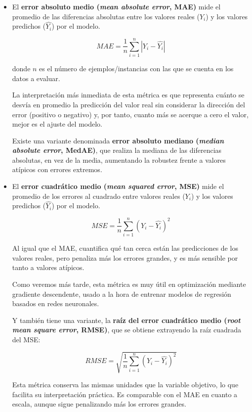 \begin{itemize}
    \item El \textbf{error absoluto medio (\textit{mean absolute error}, MAE)} mide el promedio de las 
    diferencias absolutas entre los valores reales ($Y_i$) y los valores predichos ($\hat{Y_i}$) por el 
    modelo.

    $$
    MAE = \frac{1}{n} \sum_{i=1}^n{|Y_i - \hat{Y_i}|}
    $$

    donde $n$ es el número de ejemplos/instancias con las que se cuenta en los datos a evaluar.

    La interpretación más inmediata de esta métrica es que representa cuánto se desvía en promedio la 
    predicción del valor real sin considerar la dirección del error (positivo o negativo) y, por tanto, cuanto 
    más se acerque a cero el valor, mejor es el ajuste del modelo.

    Existe una variante denominada \textbf{error absoluto mediano (\textit{median absolute error}, MedAE)}, 
    que realiza la mediana de las diferencias absolutas, en vez de la media, aumentando la robustez frente a 
    valores atípicos con errores extremos.

    \item El \textbf{error cuadrático medio (\textit{mean squared error}, MSE)} mide el promedio de los 
    errores al cuadrado entre valores reales ($Y_i$) y los valores predichos ($\hat{Y_i}$) por el modelo.
    
    $$
    MSE = \frac{1}{n} \sum_{i=1}^n{(Y_i - \hat{Y_i})^2}
    $$

    Al igual que el MAE, cuantifica qué tan cerca están las predicciones de los valores reales, pero penaliza
    más los errores grandes, y es más sensible por tanto a valores atípicos.

    Como veremos más tarde, esta métrica es muy útil en optimización mediante gradiente descendente, usado a 
    la hora de entrenar modelos de regresión basados en redes neuronales.

    Y también tiene una variante, la \textbf{raíz del error cuadrático medio (\textit{root mean square error}, 
    RMSE)}, que se obtiene extrayendo la raíz cuadrada del MSE:

    $$
    RMSE = \sqrt{\frac{1}{n} \sum_{i=1}^{n}{(Y_i-\hat{Y_i})^2} }
    $$

    Esta métrica conserva las mismas unidades que la variable objetivo, lo que facilita su interpretación 
    práctica. Es comparable con el MAE en cuanto a escala, aunque sigue penalizando más los errores grandes.


\end{itemize}
